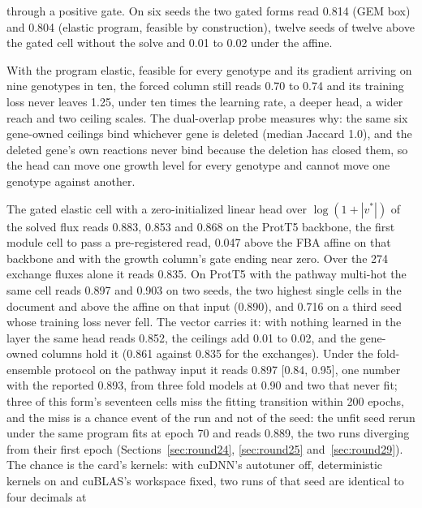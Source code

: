 \begin{description}
    through a positive gate. On six seeds the two gated forms read 0.814 (GEM box) and
    0.804 (elastic program, feasible by construction), twelve seeds of twelve above the
    gated cell without the solve and 0.01 to 0.02 under the affine.
  \item[The ceilings cannot carry the ranking, so the forced growth column cannot be
    trained.] With the program elastic, feasible for every genotype and its gradient
    arriving on nine genotypes in ten, the forced column still reads 0.70 to 0.74 and
    its training loss never leaves 1.25, under ten times the learning rate, a deeper
    head, a wider reach and two ceiling scales. The dual-overlap probe measures why: the
    same six gene-owned ceilings bind whichever gene is deleted (median Jaccard 1.0), and
    the deleted gene's own reactions never bind because the deletion has closed them, so
    the head can move one growth level for every genotype and cannot move one genotype
    against another.
  \item[The solve's flux vector, read by a linear head, is the module's number.] The
    gated elastic cell with a zero-initialized linear head over $\log(1 + |v^*|)$ of the
    solved flux reads 0.883, 0.853 and 0.868 on the ProtT5 backbone, the first module
    cell to pass a pre-registered read, 0.047 above the FBA affine on that backbone and
    with the growth column's gate ending near zero. Over the 274 exchange fluxes alone it
    reads 0.835. On ProtT5 with the pathway multi-hot the same cell reads 0.897 and 0.903
    on two seeds, the two highest single cells in the document and above the affine on
    that input (0.890), and 0.716 on a third seed whose training loss never fell. The
    vector carries it: with nothing learned in the layer the same head reads 0.852,
    the ceilings add 0.01 to 0.02, and the gene-owned columns hold it (0.861 against
    0.835 for the exchanges). Under the fold-ensemble protocol on the pathway input it
    reads 0.897 [0.84, 0.95], one number with the reported 0.893, from three fold
    models at 0.90 and two that never fit; three of this form's seventeen cells miss
    the fitting transition within 200 epochs, and the miss is a chance event of the run
    and not of the seed: the unfit seed rerun under the same program fits at epoch 70
    and reads 0.889, the two runs diverging from their first epoch
    (Sections~\ref{sec:round24}, \ref{sec:round25} and~\ref{sec:round29}). The chance
    is the card's kernels: with cuDNN's autotuner off, deterministic kernels on and
    cuBLAS's workspace fixed, two runs of that seed are identical to four decimals at

\end{description}
